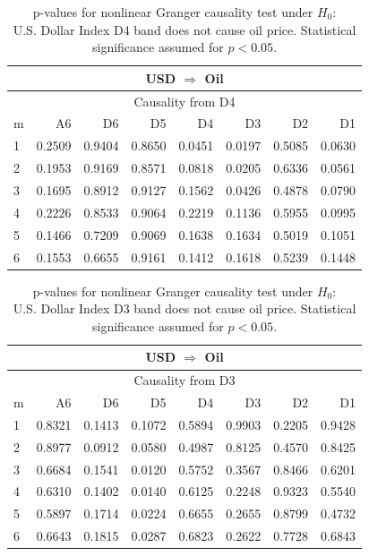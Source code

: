 %
%
\begin{table}[H]
\begin{center}
\begin{tabular}{l|r r r r r r r}
\hline\hline
\multicolumn{8}{c}{USD $\Rightarrow$ Oil}\\
\hline
\multicolumn{8}{c}{Causality from D4}\\
\hline\hline
m & A6 & D6 & D5 & D4 & D3 & D2 & D1 \\
\hline
1 & 0.2509 & 0.9404 & 0.8650 & \cellcolor{mygreen}0.0451 & \cellcolor{mygrey}0.0197 & 0.5085 & 0.0630 \\
2 & 0.1953 & 0.9169 & 0.8571 & 0.0818 & \cellcolor{mygrey}0.0205 & 0.6336 & 0.0561 \\
3 & 0.1695 & 0.8912 & 0.9127 & 0.1562 & \cellcolor{mygrey}0.0426 & 0.4878 & 0.0790 \\
4 & 0.2226 & 0.8533 & 0.9064 & 0.2219 & 0.1136 & 0.5955 & 0.0995 \\
5 & 0.1466 & 0.7209 & 0.9069 & 0.1638 & 0.1634 & 0.5019 & 0.1051 \\
6 & 0.1553 & 0.6655 & 0.9161 & 0.1412 & 0.1618 & 0.5239 & 0.1448 \\
\hline\hline
\end{tabular}
\caption{p-values for nonlinear Granger causality test under $H_0$:\\
U.S. Dollar Index D4 band does not cause oil price. Statistical significance assumed for $p<0.05$.}
\end{center}
\end{table}

%
%
\begin{table}[H]
\begin{center}
\begin{tabular}{l|r r r r r r r}
\hline\hline
\multicolumn{8}{c}{USD $\Rightarrow$ Oil}\\
\hline
\multicolumn{8}{c}{Causality from D3}\\
\hline\hline
m & A6 & D6 & D5 & D4 & D3 & D2 & D1 \\
\hline
1 & 0.8321 & 0.1413 & 0.1072 & 0.5894 & 0.9903 & 0.2205 & 0.9428 \\
2 & 0.8977 & 0.0912 & 0.0580 & 0.4987 & 0.8125 & 0.4570 & 0.8425 \\
3 & 0.6684 & 0.1541 & \cellcolor{mygrey}0.0120 & 0.5752 & 0.3567 & 0.8466 & 0.6201 \\
4 & 0.6310 & 0.1402 & \cellcolor{mygrey}0.0140 & 0.6125 & 0.2248 & 0.9323 & 0.5540 \\
5 & 0.5897 & 0.1714 & \cellcolor{mygrey}0.0224 & 0.6655 & 0.2655 & 0.8799 & 0.4732 \\
6 & 0.6643 & 0.1815 & \cellcolor{mygrey}0.0287 & 0.6823 & 0.2622 & 0.7728 & 0.6843 \\
\hline\hline
\end{tabular}
\caption{p-values for nonlinear Granger causality test under $H_0$:\\
U.S. Dollar Index D3 band does not cause oil price. Statistical significance assumed for $p<0.05$.}
\end{center}
\end{table}

